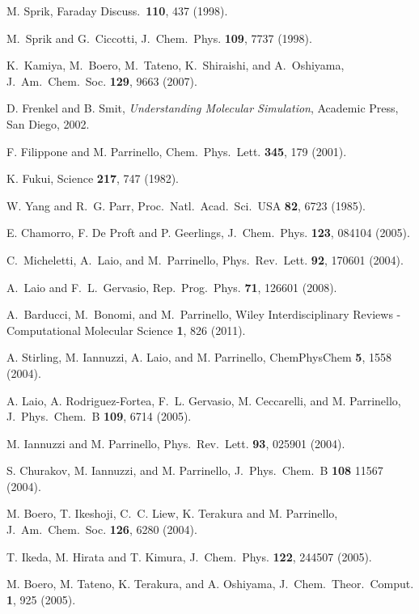 \documentclass[twoside,10pt,titlepage,a4paper]{article}
\begin{document}
\begin{thebibliography}{999}
    M. Sprik, Faraday Discuss.\ {\bf 110}, 437 (1998).

 M.~Sprik and G.~Ciccotti,
    J.~Chem.~Phys. {\bf 109}, 7737 (1998).

    K.~Kamiya, M.~Boero, M.~Tateno, K.~Shiraishi, and A.~Oshiyama,
    J.~Am.~Chem.~Soc. {\bf 129}, 9663 (2007).

    D. Frenkel and B. Smit,
    {\em Understanding Molecular Simulation},
    Academic Press, San Diego, 2002.

 F. Filippone and M. Parrinello,
     Chem.~Phys.~Lett. {\bf 345}, 179 (2001).

 K. Fukui, Science {\bf 217}, 747 (1982).

 W. Yang and R.~G. Parr,
     Proc.~Natl.~Acad.~Sci.~USA {\bf 82}, 6723 (1985).

 E. Chamorro, F. De Proft and P. Geerlings,
     J.~Chem.~Phys. {\bf 123}, 084104 (2005).

 C.~Micheletti,  A.~Laio, and M.~Parrinello,
      Phys.~Rev.~Lett. {\bf 92}, 170601 (2004).

 A.~Laio and F.~L.~Gervasio,
      Rep.~Prog.~Phys. {\bf 71}, 126601 (2008).

 A.~Barducci, M.~Bonomi, and M.~Parrinello,
      Wiley Interdisciplinary Reviews - Computational Molecular Science
      {\bf 1}, 826 (2011).

 A. Stirling, M. Iannuzzi, A. Laio, and M. Parrinello,
       ChemPhysChem {\bf 5}, 1558 (2004).

 A. Laio, A. Rodriguez-Fortea, F.~L. Gervasio, M. Ceccarelli,
       and M. Parrinello, J.~Phys.~Chem.~B {\bf 109}, 6714 (2005).

 M. Iannuzzi and M. Parrinello,
         Phys.~Rev.~Lett. {\bf 93}, 025901 (2004).

 S. Churakov, M. Iannuzzi, and M. Parrinello,
       J.~Phys.~Chem.~B {\bf 108} 11567 (2004).

 M. Boero, T. Ikeshoji, C.~C. Liew, K. Terakura and M. Parrinello,
      J.~Am.~Chem.~Soc. {\bf 126}, 6280 (2004).

 T. Ikeda, M. Hirata and T. Kimura,
      J.~Chem.~Phys. {\bf 122}, 244507 (2005).

 M. Boero, M. Tateno, K. Terakura, and A. Oshiyama,
     J.~Chem.~Theor.~Comput. {\bf 1}, 925 (2005).


\end{thebibliography}
\end{document}
